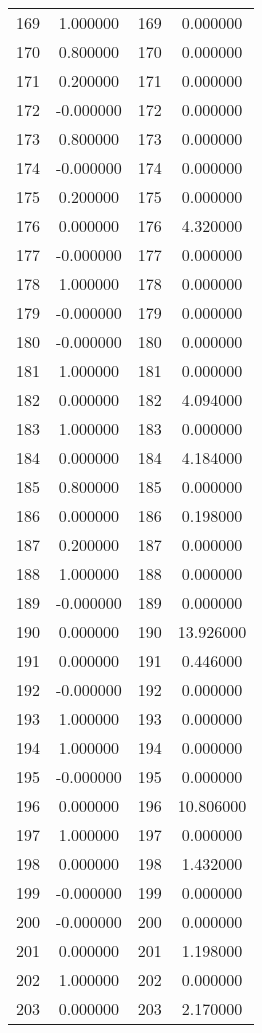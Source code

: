 \documentclass[12pt]{article}
\begin{document}
\begin{longtable}{@{}cccc@{}}
169 & 1.000000 & 169 & 0.000000 \\
170 & 0.800000 & 170 & 0.000000 \\
171 & 0.200000 & 171 & 0.000000 \\
172 & -0.000000 & 172 & 0.000000 \\
173 & 0.800000 & 173 & 0.000000 \\
174 & -0.000000 & 174 & 0.000000 \\
175 & 0.200000 & 175 & 0.000000 \\
176 & 0.000000 & 176 & 4.320000 \\
177 & -0.000000 & 177 & 0.000000 \\
178 & 1.000000 & 178 & 0.000000 \\
179 & -0.000000 & 179 & 0.000000 \\
180 & -0.000000 & 180 & 0.000000 \\
181 & 1.000000 & 181 & 0.000000 \\
182 & 0.000000 & 182 & 4.094000 \\
183 & 1.000000 & 183 & 0.000000 \\
184 & 0.000000 & 184 & 4.184000 \\
185 & 0.800000 & 185 & 0.000000 \\
186 & 0.000000 & 186 & 0.198000 \\
187 & 0.200000 & 187 & 0.000000 \\
188 & 1.000000 & 188 & 0.000000 \\
189 & -0.000000 & 189 & 0.000000 \\
190 & 0.000000 & 190 & 13.926000 \\
191 & 0.000000 & 191 & 0.446000 \\
192 & -0.000000 & 192 & 0.000000 \\
193 & 1.000000 & 193 & 0.000000 \\
194 & 1.000000 & 194 & 0.000000 \\
195 & -0.000000 & 195 & 0.000000 \\
196 & 0.000000 & 196 & 10.806000 \\
197 & 1.000000 & 197 & 0.000000 \\
198 & 0.000000 & 198 & 1.432000 \\
199 & -0.000000 & 199 & 0.000000 \\
200 & -0.000000 & 200 & 0.000000 \\
201 & 0.000000 & 201 & 1.198000 \\
202 & 1.000000 & 202 & 0.000000 \\
203 & 0.000000 & 203 & 2.170000 \\

\end{longtable}
\end{document}
